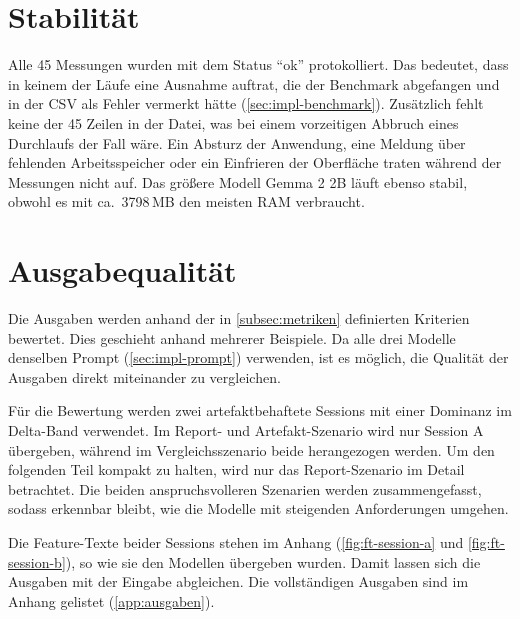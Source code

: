 \section{Stabilität}
\label{sec:eval-stabilitaet}
Alle 45 Messungen wurden mit dem Status \enquote{ok} protokolliert. Das bedeutet, dass in keinem der Läufe eine Ausnahme auftrat, die der Benchmark abgefangen und in der \ac{CSV} als Fehler vermerkt hätte (\autoref{sec:impl-benchmark}). Zusätzlich fehlt keine der 45 Zeilen in der Datei, was bei einem vorzeitigen Abbruch eines Durchlaufs der Fall wäre. Ein Absturz der Anwendung, eine Meldung über fehlenden Arbeitsspeicher oder ein Einfrieren der Oberfläche traten während der Messungen nicht auf.
Das größere Modell Gemma 2 2B läuft ebenso stabil, obwohl es mit ca.\ 3798\,MB den meisten \ac{RAM} verbraucht.

\section{Ausgabequalität}
\label{sec:eval-qualitaet}
\label{subsec:eval-beispiele}
Die Ausgaben werden anhand der in \autoref{subsec:metriken} definierten Kriterien bewertet. Dies geschieht anhand mehrerer Beispiele. Da alle drei Modelle denselben Prompt (\autoref{sec:impl-prompt}) verwenden, ist es möglich, die Qualität der Ausgaben direkt miteinander zu vergleichen.
\vspace{\baselineskip}

\noindent Für die Bewertung werden zwei artefaktbehaftete Sessions mit einer Dominanz im Delta-Band verwendet. Im Report- und Artefakt-Szenario wird nur Session A übergeben, während im Vergleichsszenario beide herangezogen werden. Um den folgenden Teil kompakt zu halten, wird nur das Report-Szenario im Detail betrachtet. Die beiden anspruchsvolleren Szenarien werden zusammengefasst, sodass erkennbar bleibt, wie die Modelle mit steigenden Anforderungen umgehen.
\vspace{\baselineskip}

\noindent Die Feature-Texte beider Sessions stehen im Anhang (\autoref{fig:ft-session-a} und \autoref{fig:ft-session-b}), so wie sie den Modellen übergeben wurden. Damit lassen sich die Ausgaben mit der Eingabe abgleichen. Die vollständigen Ausgaben sind im Anhang gelistet (\autoref{app:ausgaben}).

